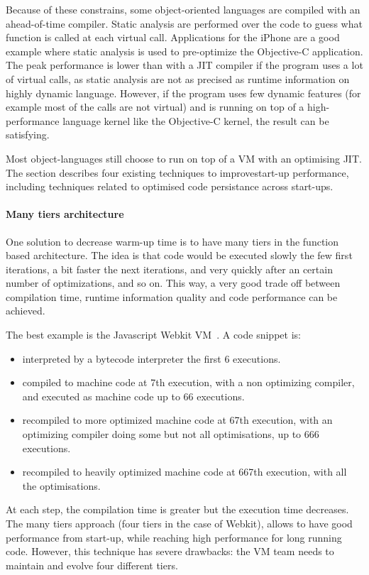 \documentclass[a4paper,12pt,twoside]{../includes/ThesisStyle}
\begin{document}
Because of these constrains, some object-oriented languages are compiled with an ahead-of-time compiler. Static analysis are performed over the code to guess what function is called at each virtual call. Applications for the iPhone are a good example where static analysis is used to pre-optimize the Objective-C application. The peak performance is lower than with a JIT compiler if the program uses a lot of virtual calls, as static analysis are not as precised as runtime information on highly dynamic language. However, if the program uses few dynamic features (for example most of the calls are not virtual) and is running on top of a high-performance language kernel like the Objective-C kernel, the result can be satisfying.

Most object-languages still choose to run on top of a VM with an optimising JIT. The section describes four existing techniques to improvestart-up performance, including techniques related to optimised code persistance across start-ups.

\paragraph{Many tiers architecture}
One solution to decrease warm-up time is to have many tiers in the function based architecture. The idea is that code would be executed slowly the few first iterations, a bit faster the next iterations, and very quickly after an certain number of optimizations, and so on. This way, a very good trade off between compilation time, runtime information quality and code performance can be achieved.

The best example is the Javascript Webkit VM~\cite{Webkit15}. A code snippet is:
\begin{itemize}
\item interpreted by a bytecode interpreter the first 6 executions.
\item compiled to machine code at 7th execution, with a non optimizing compiler, and executed as machine code up to 66 executions.
\item recompiled to more optimized machine code at 67th execution, with an optimizing compiler doing some but not all optimisations, up to 666 executions.
\item recompiled to heavily optimized machine code at 667th execution, with all the optimisations.
\end{itemize}

At each step, the compilation time is greater but the execution time decreases. The many tiers approach (four tiers in the case of Webkit), allows to have good performance from start-up, while reaching high performance for long running code. However, this technique has severe drawbacks: the VM team needs to maintain and evolve four different tiers.
\end{document}
